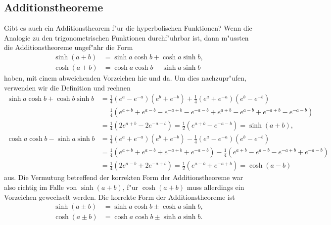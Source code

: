 \documentclass[a4paper,12pt]{article}
\begin{document}
\subsection{Additionstheoreme}
Gibt es auch ein Additionstheorem f"ur die hyperbolischen Funktionen?
Wenn die Analogie zu den trigonometrischen Funktionen durchf"uhrbar ist,
dann m"ussten die Additionstheoreme ungef"ahr die Form
\begin{align*}
\sinh(a+b)&=\sinh a\cosh b + \cosh a\sinh b,\\
\cosh(a+b)&=\cosh a\cosh b - \sinh a\sinh b
\end{align*}
haben, mit einem abweichenden Vorzeichen hie und da.
Um dies nachzupr"ufen, verwenden wir die Definition und rechnen
\begin{align*}
\sinh a\cosh b + \cosh b\sinh b
&=
\frac14(e^a-e^{-a})(e^b+e^{-b})
+
\frac14(e^a+e^{-a})(e^b-e^{-b})
\\
&=\frac14(e^{a+b}+e^{a-b}-e^{-a+b}-e^{-a-b} + e^{a+b}-e^{a-b}+e^{-a+b}-e^{-a-b})
\\
&=
\frac14(2e^{a+b}-2e^{-a-b})
=
\frac12(e^{a+b}-e^{-a-b})=\sinh(a+b),
\\
\cosh a\cosh b-\sinh a\sinh b
&=
\frac14(e^a+e^{-a})(e^b+e^{-b})
-
\frac14(e^a-e^{-a})(e^b-e^{-b})
\\
&=
\frac14(e^{a+b}+e^{a-b}+e^{-a+b}+e^{-a-b})
-
\frac14(e^{a+b}-e^{a-b}-e^{-a+b}+e^{-a-b})
\\
&=
\frac14(2e^{a-b}+2e^{-a+b})
=
\frac12(e^{a-b}+e^{-a+b})=\cosh(a-b)
\end{align*}
aus.
Die Vermutung betreffend der korrekten Form der Additionstheoreme
war also richtig im Falle von $\sinh(a+b)$, f"ur $\cosh(a+b)$ muss
allerdings ein Vorzeichen gewechselt werden.
Die korrekte Form der Additionstheoreme ist
\begin{align*}
\sinh(a\pm b)&=\sinh a\cosh b \pm \cosh a\sinh b,\\
\cosh(a\pm b)&=\cosh a\cosh b \pm \sinh a\sinh b.
\end{align*}
\end{document}
